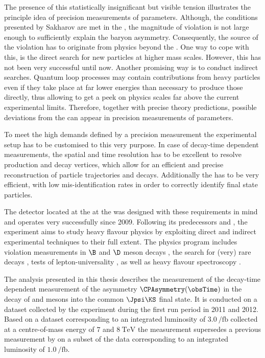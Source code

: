 The presence of this statistically insignificant but visible tension illustrates
the principle idea of precision measurements of \CKM parameters. Although, the
conditions presented by Sakharov are met in the \SM, the magnitude of \CP
violation is not large enough to sufficiently explain the baryon asymmetry.
Consequently, the source of the \CP violation has to originate from physics
beyond the \SM. One way to cope with this, is the direct search for new
particles at higher mass scales. However, this has not been very successful
until now. Another promising way is to conduct indirect searches. Quantum loop
processes may contain contributions from heavy particles even if they take place
at far lower energies than necessary to produce those directly, thus allowing to
get a peek on physics scales far above the current experimental limits.
Therefore, together with precise theory predictions, possible deviations from
the \SM can appear in precision measurements of \SM parameters.

To meet the high demands defined by a precision measurement the experimental
setup has to be customised to this very purpose. In case of decay-time dependent
measurements, the spatial and time resolution has to be excellent to resolve
production and decay vertices, which allow for an efficient and precise
reconstruction of particle trajectories and decays. Additionally the \PID has to
be very efficient, with low mis-identification rates in order to correctly
identify final state particles.

The \LHCb detector located at the \LHC at the \CERN was designed with these
requirements in mind and operates very successfully since 2009. Following its
predecessors \Babar and \Belle, the \LHCb experiment aims to study heavy flavour
physics by exploiting direct and indirect experimental techniques to their full
extent. The physics program includes \CP violation measurements in $\B$ and $\D$
meson decays
\cite{Aaij:2015tza,Aaij:2015yda,Aaij:2014uva,Aaij:2014fba,Aaij:2014dka,Aaij:2014zsa,Aaij:2014kxa}, 
the search for (very) rare decays \cite{CMS:2014xfa}, tests of
lepton-universality \cite{Aaij:2014ora,Aaij:2015yra}, as well as heavy flavour
spectroscopy \cite{Aaij:2014yka,Aaij:2015tga}.

The analysis presented in this thesis describes the measurement of the
decay-time dependent measurement of the \CP asymmetry $\CPAsymmetry(\obsTime)$
in the decay of \Bd and \Bdbar mesons into the common $\Jpsi\KS$ final state. It
is conducted on a dataset collected by the \LHCb experiment during the first
\LHC run period in 2011 and 2012. Based on a dataset corresponding to an
integrated luminosity of $\SI{3.0}{\per\femto\barn}$ collected at a
centre-of-mass energy of $\num{7}$ and $\SI{8}{\TeV}$ the measurement supersedes
a previous measurement by \LHCb \cite{Aaij:1497268} on a subset of the data
corresponding to an integrated luminosity of $\SI{1.0}{\per\femto\barn}$.


